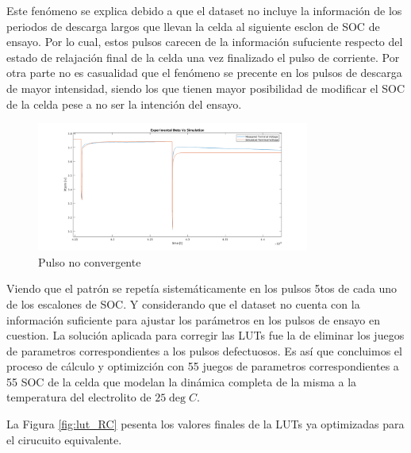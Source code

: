 \documentclass[10pt, a4paper]{report}
\begin{document}
Este fenómeno se explica debido a que el dataset no incluye la información de
los periodos de descarga largos que llevan la celda al siguiente esclon de
\acrshort{SOC} de ensayo. Por lo cual, estos pulsos carecen de la información
sufuciente respecto del estado de relajación final de la celda una vez
finalizado el pulso de corriente. Por otra parte no es casualidad que el
fenómeno se precente en los pulsos de descarga de mayor intensidad, siendo los
que tienen mayor posibilidad de modificar el \acrshort{SOC} de la celda pese a
no ser la intención del ensayo.

\begin{figure}[h!]
	\begin{center}
        \includegraphics[width=0.8\textwidth]{Vterm_exp_vs_sim_pulse_5_error.png}
		\caption{Pulso no convergente}
		\label{fig:exp_vs_sim_5_error}
	\end{center}
\end{figure}

Viendo que el patrón se repetía sistemáticamente en los pulsos 5tos de cada uno
de los escalones de \acrshort{SOC}. Y considerando que el dataset no cuenta con
la información suficiente para ajustar los parámetros en los pulsos de ensayo en
cuestion. La solución aplicada para corregir las \acrshort{LUT}s fue la de
eliminar los juegos de parametros correspondientes a los pulsos defectuosos. Es
así que concluimos el proceso de cálculo y optimizción con 55 juegos de
parametros correspondientes a 55 \acrshort{SOC} de la celda que modelan la
dinámica completa de la misma a la temperatura del electrolito de $25\deg C$.

La Figura \ref{fig:lut_RC} pesenta los valores finales de la \acrshort{LUT}s ya
optimizadas para el cirucuito equivalente.
\end{document}
